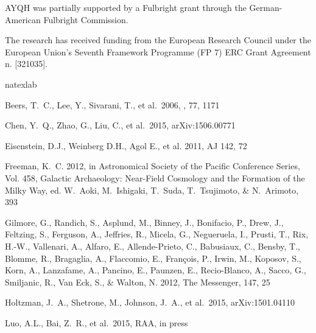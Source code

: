 \documentclass[12pt, preprint]{aastex}
\begin{document}
AYQH was partially supported by a Fulbright grant through the German-American
Fulbright Commission.

The research has received funding from the European Research Council under the 
European Union's Seventh Framework Programme (FP 7) ERC Grant Agreement n.
[321035].

\begin{thebibliography}{24}
\expandafter\ifx\csname natexlab\endcsname\relax\def\natexlab#1{#1}\fi

 Beers, T.~C., Lee, Y., 
Sivarani, T., et al.\ 2006, \memsai, 77, 1171 

 Chen, Y.~Q., Zhao, G., 
Liu, C., et al.\ 2015, arXiv:1506.00771 

 Eisenstein, D.J., Weinberg D.H., Agol E., et al. 2011, AJ 142, 72

{Freeman}, K.~C. 2012, in Astronomical Society of the Pacific Conference
  Series, Vol. 458, Galactic Archaeology: Near-Field Cosmology and the
  Formation of the Milky Way, ed. W.~{Aoki}, M.~{Ishigaki}, T.~{Suda},
  T.~{Tsujimoto}, \& N.~{Arimoto}, 393

{Gilmore}, G., {Randich}, S., {Asplund}, M., {Binney}, J., {Bonifacio}, P.,
  {Drew}, J., {Feltzing}, S., {Ferguson}, A., {Jeffries}, R., {Micela}, G.,
  {Negueruela}, I., {Prusti}, T., {Rix}, H.-W., {Vallenari}, A., {Alfaro}, E.,
  {Allende-Prieto}, C., {Babusiaux}, C., {Bensby}, T., {Blomme}, R.,
  {Bragaglia}, A., {Flaccomio}, E., {Fran{\c c}ois}, P., {Irwin}, M.,
  {Koposov}, S., {Korn}, A., {Lanzafame}, A., {Pancino}, E., {Paunzen}, E.,
  {Recio-Blanco}, A., {Sacco}, G., {Smiljanic}, R., {Van Eck}, S., \& {Walton},
  N. 2012, The Messenger, 147, 25

 Holtzman, J.~A., 
Shetrone, M., Johnson, J.~A., et al.\ 2015, arXiv:1501.04110 

 Luo, A.L., Bai, Z.~R., et al.\ 2015, RAA, in press


\end{thebibliography}
\end{document}
